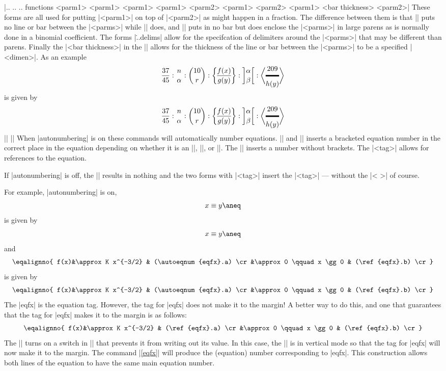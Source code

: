 \mbr
\pla\@|\above..  \atop..  \over..  functions
     {<parm1> }
     {<parm1> }
     {<parm1> }
     {<parm1>   <parm2>}
     {<parm1>  <parm2>}
     {<parm1> 
            <bar thickness>  <parm2>}|
\nbr
These forms are all used for putting |<parm1>| on top of |<parm2>| as might
happen in a fraction. The difference between them is that |\atop| puts no
line or bar between the |<parms>| while |\over| does, and |\choose| puts in
no bar but does enclose the |<parms>| in large parens as is normally done in
a binomial coefficient. The forms |\...delims| allow for the specifcation of
delimiters around the |<parms>| that may be different than parens. Finally
the |<bar thickness>| in the |\abovewithdelims| allows for the thickness of
the line or bar between the |<parms>| to be a specified |<dimen>|. As an
example
$$
{37 \over 45} : {n \atop \alpha} : {10 \choose r} 
: {f(x) \overwithdelims\{\} g(y)} 
: {\alpha \atopwithdelims][ \beta}
: {209 \abovewithdelims\langle\rangle 2pt h(y)}
$$
is given by
\begintt
$$
{37 \over 45} : {n \atop \alpha} : {10 \choose r} 
: {f(x) \overwithdelims\{\} g(y)} 
: {\alpha \atopwithdelims][ \beta}
: {209 \abovewithdelims\langle\rangle 2pt h(y)}
$$
\endtt
\mbr
\ext|\aneq   {}|  
\nbr
\ext||
\nbr
When |autonumbering| is on these commands will automatically number
equations. |\aneq| and || inserts a bracketed equation number
in the correct place in the equation depending on whether it is an
|\eqalign|, |\eqalignno|, or |\leqalignno|. The || inserts a
number without brackets. The |<tag>| allows for references to the equation.

If |autonumbering| is off, the |\aneq| results in nothing and the two forms
with |<tag>| insert the |<tag>| --- without the |< >| of course.

For example, |autonumbering| is on,
$$
x \equiv y      \aneq
$$
is given by
\begintt
$$
x \equiv y      \aneq
$$
\endtt
and 
$$
\eqalignno{ f(x)&\approx K x^{-3/2}   & (\autoeqnum{eqfx}.a) \cr
                &\approx 0 \qquad x \gg 0   & (\ref{eqfx}.b) \cr}
$$
is given by
\begintt
$$
\eqalignno{ f(x)&\approx K x^{-3/2}   & (\autoeqnum{eqfx}.a) \cr
                &\approx 0 \qquad x \gg 0   & (\ref{eqfx}.b) \cr}
$$
\endtt
The |eqfx| is the equation tag. However,  the
tag for |eqfx| does not make it to the margin! A better way to do this, and
one that guarantees that the tag for |eqfx| makes it to the margin is as
follows:
\begintt
{\silenttrue {}}
$$
\eqalignno{ f(x)&\approx K x^{-3/2}   & (\ref{eqfx}.a) \cr
                &\approx 0 \qquad x \gg 0   & (\ref{eqfx}.b) \cr}
$$
\endtt
The \@|\silenttrue| turns on a switch in || that prevents it
from writing out its value. 
In this case, the || is in vertical mode
so that the tag for |eqfx| will now make it to the margin. 
The command |\ref{eqfx}| will produce the
(equation) number corresponding to |eqfx|. This construction allows 
both lines of the equation to have the same main equation number.

